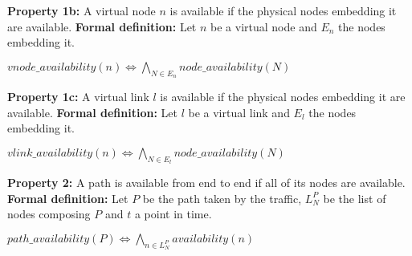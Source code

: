 \textbf{Property 1b:} A virtual node $n$ is available if the physical nodes embedding it are available.
\newline
\textbf{Formal definition:} Let $n$ be a virtual node and $E_n$ the nodes embedding it.

\begin{myformula}
$vnode\_availability(n) \Leftrightarrow \bigwedge\limits_{N \in E_n} node\_availability(N)$
\end{myformula}

\textbf{Property 1c:} A virtual link $l$ is available if the physical nodes embedding it are available.
\newline
\textbf{Formal definition:} Let $l$ be a virtual link and $E_l$ the nodes embedding it.

\begin{myformula}
$vlink\_availability(n) \Leftrightarrow \bigwedge\limits_{N \in E_l} node\_availability(N)$
\end{myformula}

\textbf{Property 2:} A path is available from end to end if all of its nodes are available.
\newline \textbf{Formal definition:} Let $P$ be the path taken by the traffic, $L^P_N$ be the list of nodes composing $P$ and $t$ a point in time. 

\begin{myformula}
$path\_availability(P)\Leftrightarrow\bigwedge\limits_{n \in L^P_N}availability(n)$
\end{myformula}






